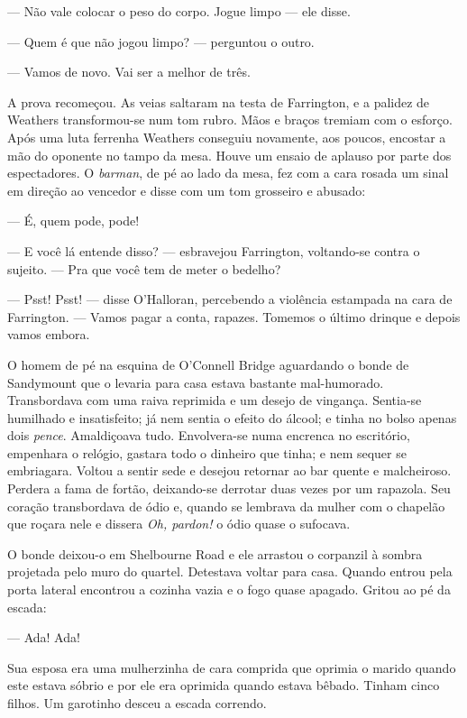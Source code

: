--- Não vale colocar o peso do corpo.  Jogue limpo --- ele disse.

--- Quem é que não jogou limpo? --- perguntou o outro.

--- Vamos de novo.  Vai ser a melhor de três.

A prova recomeçou.  As veias saltaram na testa de Farrington, e a palidez de
Weathers transformou-se num tom rubro.  Mãos e braços tremiam com o esforço.
Após uma luta ferrenha Weathers conseguiu novamente, aos poucos, encostar a mão
do oponente no tampo da mesa.  Houve um ensaio de aplauso por parte dos
espectadores.  O \textit{barman}, de pé ao lado da mesa, fez com a cara rosada
um sinal em direção ao vencedor e disse com um tom grosseiro e abusado:

--- É, quem pode, pode!

--- E você lá entende disso? --- esbravejou Farrington, voltando-se contra o
sujeito.  --- Pra que você tem de meter o bedelho?

--- Psst! Psst! --- disse O’Halloran, percebendo a violência estampada na cara
de Farrington.  --- Vamos pagar a conta, rapazes.  Tomemos o último drinque e
depois vamos embora.

\smallskip

\noindent\dotfill

\smallskip

O homem de pé na esquina de O’Connell Bridge aguardando o bonde de Sandymount
que o levaria para casa estava bastante mal-humorado.  Transbordava com uma
raiva reprimida e um desejo de vingança.  Sentia-se humilhado e insatisfeito;
já nem sentia o efeito do álcool; e tinha no bolso apenas dois \textit{pence}.
Amaldiçoava tudo.  Envolvera-se numa encrenca no escritório, empenhara o
relógio, gastara todo o dinheiro que tinha; e nem sequer se embriagara.  Voltou
a sentir sede e desejou retornar ao bar quente e malcheiroso.  Perdera a fama
de fortão, deixando-se derrotar duas vezes por um rapazola.  Seu coração
transbordava de ódio e, quando se lembrava da mulher com o chapelão que roçara
nele e dissera \textit{Oh, pardon!} o ódio quase o sufocava.

O bonde deixou-o em Shelbourne Road e ele arrastou o corpanzil à sombra
projetada pelo muro do quartel.  Detestava voltar para casa.  Quando entrou
pela porta lateral encontrou a cozinha vazia e o fogo quase apagado.  Gritou ao
pé da escada:

--- Ada!  Ada!

Sua esposa era uma mulherzinha de cara comprida que oprimia o marido quando
este estava sóbrio e por ele era oprimida quando estava bêbado.  Tinham cinco
filhos.  Um garotinho desceu a escada correndo.

